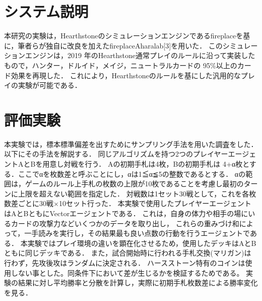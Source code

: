\documentclass[twocolumn]{ltjsarticle}
\begin{document}
\section{システム説明}
\small{
  本研究の実験は，Hearthstoneのシミュレーションエンジンであるfireplaceを基に，筆者らが独自に改良を加えたfireplaceAharalab[3]を用いた．
  このシミュレーションエンジンは，2019 年のHearthstone通常プレイのルールに沿って実装したもので，ハンター，ドルイド，メイジ，ニュートラルカードの 95\%以上のカード効果を再現した．
  これにより，Hearthstoneのルールを基にした汎用的なプレイの実験が可能である．
}
\section{評価実験}
\small{
  本実験では，標本標準偏差を出すためにサンプリング手法を用いた調査をした．
  以下にその手法を解説する．
  同じアルゴリズムを持つ2つのプレイヤーエージェントAとBを用意し対戦を行う．
  Aの初期手札は4枚，Bの初期手札は 4+α枚とする．ここでαを枚数差と呼ぶことにし，αは1≦α≦5の整数であるとする．
  αの範囲は，ゲームのルール上手札の枚数の上限が10枚であることを考慮し最初のターンに上限を超えない範囲を指定した．
  対戦数は1セット30戦として，これを各枚数差ごとに30戦×10セット行った．%
  本実験で使用したプレイヤーエージェントはAとBともにVectorエージェントである．
  これは，自身の体力や相手の場にいるカードの攻撃力などいくつかのデータを取り出し，
  これらの重みづけ和によって，一手読みを実行し，その結果最も良い点数の行動を行うエージェントである．
  本実験ではプレイ環境の違いを顕在化させるため，使用したデッキはAとBともに同じデッキである．
  また，試合開始時に行われる手札交換(マリガン)は行わず，先攻後攻はランダムに決定される．
  ハースストーン特有のコインは使用しない事とした。同条件下において差が生じるかを検証するためである。
  実験の結果に対し平均勝率と分散を計算し，実際に初期手札枚数差による勝率変化を見る．
}
\end{document}
